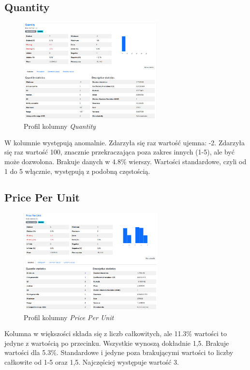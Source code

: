 \documentclass[a4paper,12pt]{article}
\begin{document}
\subsection{Quantity}

\begin{figure}[H]
  \centering
  \includegraphics[width=0.65\textwidth]{images/py_3.png}
  \caption{Profil kolumny \textit{Quantity}}
\end{figure}

W kolumnie występują anomalnie. Zdarzyła się raz wartość ujemna: -2. Zdarzyła się raz wartość 100, znacznie przekraczająca poza zakres innych (1-5), ale być może dozwolona. Brakuje danych w 4.8\% wierszy. Wartości standardowe, czyli od 1 do 5 włącznie, występują z podobną częstością.

\subsection{Price Per Unit}

\begin{figure}[H]
  \centering
  \includegraphics[width=0.65\textwidth]{images/py_4.png}
  \caption{Profil kolumny \textit{Price Per Unit}}
\end{figure}

Kolumna w większości składa się z liczb całkowitych, ale 11.3\% wartości to jedyne z wartością po przecinku. Wszystkie wynoszą dokładnie 1,5. Brakuje wartości dla 5.3\%. Standardowe i jedyne poza brakującymi wartości to liczby całkowite od 1-5 oraz 1,5. Najczęściej występuje wartość 3.
\end{document}

